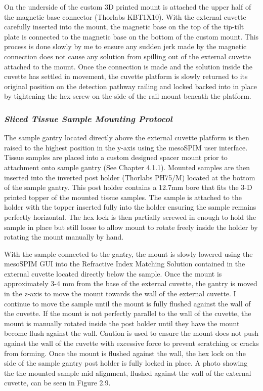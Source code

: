 On the underside of the custom 3D printed mount is attached the upper half of the magnetic base connector (Thorlabs KBT1X10). With the external cuvette carefully inserted into the mount, the magnetic base on the top of the tip-tilt plate is connected to the magnetic base on the bottom of the custom mount. This process is done slowly by me to ensure any sudden jerk made by the magnetic connection does not cause any solution from spilling out of the external cuvette attached to the mount. Once the connection is made and the solution inside the cuvette has settled in movement, the cuvette platform is slowly returned to its original position on the detection pathway railing and locked backed into in place by tightening the hex screw on the side of the rail mount beneath the platform. 

\subsubsection{\textit{Sliced Tissue Sample Mounting Protocol}}
The sample gantry located directly above the external cuvette platform is then raised to the highest position in the y-axis using the mesoSPIM user interface. Tissue samples are placed into a custom designed spacer mount prior to attachment onto sample gantry (See Chapter 4.1.1). Mounted samples are then inserted into the inverted post holder (Thorlabs PH75/M) located at the bottom of the sample gantry. This post holder contains a 12.7mm bore that fits the 3-D printed topper of the mounted tissue samples.  The sample is attached to the holder with the topper inserted fully into the holder ensuring the sample remains perfectly horizontal. The hex lock is then partially screwed in enough to hold the sample in place but still loose to allow mount to rotate freely inside the holder by rotating the mount manually by hand.

With the sample connected to the gantry, the mount is slowly lowered using the mesoSPIM GUI into the Refractive Index Matching Solution contained in the external cuvette located directly below the sample. Once the mount is approximately 3-4 mm from the base of the external cuvette, the gantry is moved in the z-axis to move the mount towards the wall of the external cuvette. I continue to move the sample until the mount is fully flushed against the wall of the cuvette. If the mount is not perfectly parallel to the wall of the cuvette, the mount is manually rotated inside the post holder until they have the mount become flush against the wall. Caution is used to ensure the mount does not push against the wall of the cuvette with excessive force to prevent scratching or cracks from forming. Once the mount is flushed against the wall, the hex lock on the side of the sample gantry post holder is fully locked in place. A photo showing the the mounted sample mid alignment, flushed against the wall of the external cuvette, can be seen in Figure 2.9.


